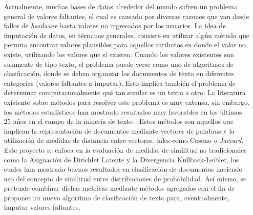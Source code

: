 Actualmente, muchas bases de datos alrededor del mundo sufren un problema general de valores faltantes, el cual es causado por diversas razones que van desde fallos de \textit{hardware} hasta valores no ingresados por los usuarios. La idea de imputación de datos, en términos generales, consiste en utilizar algún método que permita encontrar valores plausibles para aquellos atributos en donde el valor no existe, utilizando los valores que sí existen. Cuando los valores existentes son solamente de tipo texto, el problema puede verse como uno de algoritmos de clasificación, donde se deben organizar los documentos de texto en diferentes categorías (valores faltantes a imputar). Esto implica también el problema de determinar computacionalmente qué tan similar es un texto a otro. La literatura existente sobre métodos para resolver este problema es muy extensa, sin embargo, los métodos estadísticos han mostrado resultados muy favorables en los últimos 25 años en el campo de la minería de texto \cite{srivastava2009text}. Estos métodos son aquellos que implican la representación de documentos mediante vectores de palabras y la utilización de medidas de distancia entre vectores, tales como Coseno o \textit{Jaccard}. Este proyecto se enfoca en la evaluación de medidas de similitud no tradicionales como la Asignación de Dirichlet Latente y la Divergencia Kullback-Leibler, los cuales han mostrado buenos resultados en clasificación de documentos haciendo uso del concepto de similitud entre distribuciones de probabilidad. Así mismo, se pretende combinar dichas métricas mediante métodos agregados con el fin de proponer un nuevo algoritmo de clasificación de texto para, eventualmente, imputar valores faltantes.

